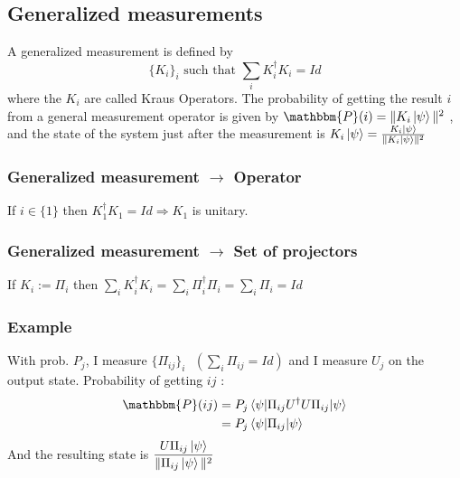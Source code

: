 \documentclass{article}
\begin{document}
\subsection{Generalized measurements}
A generalized measurement is defined by
\begin{equation}
    \{K_i\}_i \text{ such that } \sum_i K_i^\dagger K_i=Id
\end{equation}
where the $K_i$ are called Kraus Operators. The probability of getting the
result $i$ from a general measurement operator is given by $\mathbbm{P}(i) =
\|K_i\ket{\psi}\|^2$ , and the state of the system just after the measurement is
$K_i\ket{\psi}=\frac{K_i\ket{\psi}}{\|K_i\ket{\psi}\|^2}$

\subsubsection*{Generalized measurement $\rightarrow$ Operator}
If $i \in \{1\}$ then $K_1^\dagger K_1=Id \Rightarrow K_1$ is
unitary.%

\subsubsection*{Generalized measurement $\rightarrow$ Set of projectors}
If $K_i := \Pi_i$ then $\sum_i K_i^\dagger K_i = \sum_i \Pi_i^\dagger\Pi_i =
\sum_i \Pi_i = Id$

\subsubsection*{Example}
With prob. $P_j$, I measure $\{\Pi_{ij}\}_i \text{ } (\sum_i \Pi_{ij} = Id)$ and
I measure $U_j$ on the output state.
Probability of getting $ij$ :
\begin{equation}
    \begin{aligned}
        \mathbbm{P}(ij)
            &= P_j\braket{\psi | \Pi_{ij} U^\dagger U \Pi_{ij} | \psi} \\
            &= P_j\braket{\psi|\Pi_{ij}|\psi}
    \end{aligned}
\end{equation}
\noindent
And the resulting state is
$\dfrac{U\Pi_{ij}\ket{\psi}}{\|\Pi_{ij}\ket{\psi}\|^2}$
\end{document}
